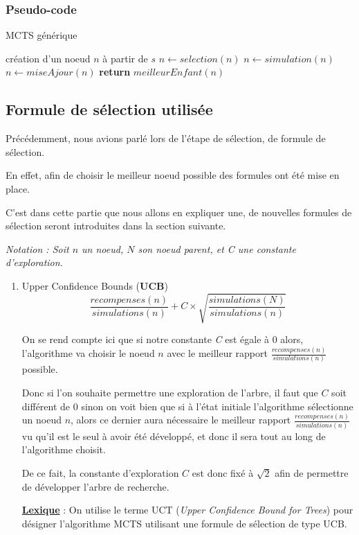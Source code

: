 \documentclass[pdftex,french, english]{article}	%
\begin{document}
	\subsubsection{Pseudo-code}
	\begin{algorithm}
	\caption{MCTS générique}
	  \label{alg:mcts}
	\begin{algorithmic}[1]
	\State création d'un noeud $n$ à partir de $s$
	\State $n \gets selection(n)$ 
	\State $n \gets simulation(n)$
	\State $n \gets miseAjour(n)$
	\EndWhile
	\State \textbf{return} $meilleurEnfant(n)$
	\EndFunction
	\end{algorithmic}
	\end{algorithm}
    
    
    
    
    
	\subsection{Formule de sélection utilisée}
	Précédemment, nous avions parlé lors de l'étape de sélection, de formule de sélection. 

	En effet, afin de choisir le meilleur noeud possible des formules ont été mise en place.

	C'est dans cette partie que nous allons en expliquer une, de nouvelles formules de sélection seront introduites
	dans la section suivante.


	\textit{Notation : Soit $n$ un noeud, $N$ son noeud parent, et C une constante d'exploration.} 

	\begin{enumerate}
		\item Upper Confidence Bounds (\textbf{UCB}) \\
		\[ \frac{recompenses(n)}{simulations(n)} + C \times \sqrt{\frac{simulations(N)}{simulations(n)}} \] 

		On se rend compte ici que si notre constante \textit{C} est égale à $0$ alors, l'algorithme va choisir le noeud $n$ avec le meilleur rapport $\frac{recompenses(n)}{simulations(n)}$ possible. 

		Donc si l'on souhaite permettre une exploration de l'arbre, il faut que $C$ soit différent de $0$ sinon on voit bien que si à l'état initiale l'algorithme sélectionne un noeud $n$, alors ce dernier aura nécessaire le meilleur rapport $\frac{recompenses(n)}{simulations(n)}$ vu qu'il est le seul à avoir été développé, et donc il sera tout au long de l'algorithme choisit. 

		De ce fait, la constante d'exploration $C$ est donc fixé à $\sqrt{2}$ afin de permettre de développer l'arbre de recherche.


		\underline{\textbf{Lexique}} : On utilise le terme UCT (\textit{Upper Confidence Bound for Trees}) pour désigner l'algorithme MCTS utilisant une formule de sélection de type UCB.
	\end{enumerate}
\end{document}
